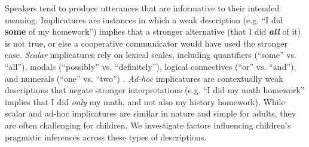 \documentclass[10pt,letterpaper]{article}
\begin{document}
Speakers tend to produce utterances that are informative to their intended meaning. Implicatures are instances in which a weak description (e.g. ``I did \textbf{some} of my homework'') implies that a stronger alternative (that I did \emph{\textbf{all}} of it) is not true, or else a cooperative communicator would have used the stronger case. \emph{Scalar} implicatures rely on lexical scales, including quantifiers (``some'' vs. ``all''), modals (``possibly'' vs. ``definitely''), logical connectives (``or'' vs. ``and''), and numerals (``one'' vs. ``two'') \citep{horn1972}. \emph{Ad-hoc} implicatures are contextually weak descriptions that negate stronger interpretations (e.g. ``I did my math homework'' implies that I did \emph{only} my math, and not also my history homework).  While scalar and ad-hoc implicatures are similar in nature and simple for adults, they are often challenging for children. We investigate factors influencing children's pragmatic inferences across these types of descriptions.


\end{document}
